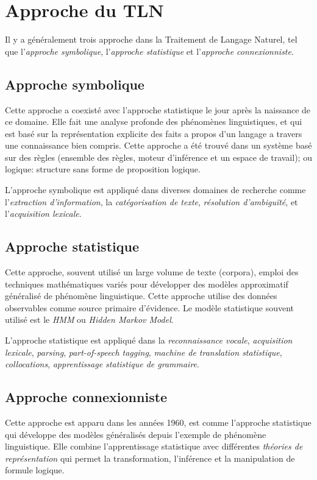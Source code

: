 \section{Approche du TLN}
Il y a généralement trois approche dans la Traitement de Langage Naturel, tel que l'\textit{approche symbolique}, l'\textit{approche statistique} et l'\textit{approche connexionniste}.

\subsection{Approche symbolique}
Cette approche a coexisté avec l'approche statistique le jour après la naissance de ce domaine. Elle fait une analyse profonde des phénomènes linguistiques, et qui est basé sur la représentation explicite des faits a propos d'un langage a travers une connaissance bien compris. Cette approche a été trouvé dans un système basé sur des règles (ensemble des règles, moteur d'inférence et un espace de travail); ou logique: structure sans forme de proposition logique.

L'approche symbolique est appliqué dans diverses domaines de recherche comme l'\textit{extraction d'information}, la \textit{catégorisation de texte}, \textit{résolution d’ambiguïté}, et l'\textit{acquisition lexicale}.

\subsection{Approche statistique}
Cette approche, souvent utilisé un large volume de texte (corpora), emploi des techniques mathématiques variés pour développer des modèles approximatif généralisé de phénomène linguistique. Cette approche utilise des données observables comme source primaire d'évidence. Le modèle statistique souvent utilisé est le \emph{HMM} ou \emph{Hidden Markov Model}.

L'approche statistique est appliqué dans la \textit{reconnaissance vocale}, \textit{acquisition lexicale}, \textit{parsing}, \textit{part-of-speech tagging}, \textit{machine de translation statistique}, \textit{collocations}, \textit{apprentissage statistique de grammaire}.

\subsection{Approche connexionniste}
Cette approche est apparu dans les années 1960, est comme l'approche statistique qui développe des modèles généralisés depuis l'exemple de phénomène linguistique. Elle combine l'apprentissage statistique avec différentes \emph{théories de représentation} qui permet la transformation, l'inférence et la manipulation de formule logique.

